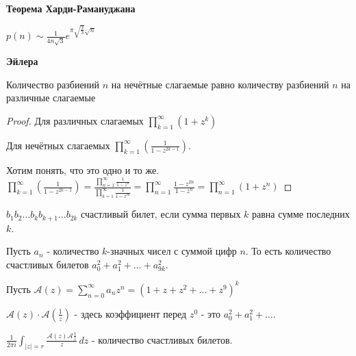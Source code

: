\begin{remark}
    \textbf{Теорема Харди-Рамануджана}

    $p(n) \sim \frac{1}{4n\sqrt{3}} e^{\pi \sqrt{\frac{2}{3}}\sqrt{n}}$
\end{remark}

\begin{theorem}
    \textbf{Эйлера}

    Количество разбиений $n$ на нечётные слагаемые равно количеству разбиений
    $n$ на различные слагаемые
\end{theorem}

\begin{proof}
    Для различных слагаемых $\prod_{k = 1}^{\infty} (1+z^k)$

    Для нечётных слагаемых $\prod_{k = 1}^{\infty} (\frac{1}{1 - z^{2k -1}})$.

    Хотим понять, что это одно и то же.$\prod_{k = 1}^{\infty} (\frac{1}{1 - z^{2k -1}}) =
    \frac{\prod_{n = 1}^{\infty} \frac{1}{1-z^n}}{\prod_{k = 1}^{\infty} \frac{1}{1-z^{2k}}} =
    \prod_{n = 1}^{\infty} \frac{1 - z^{2n}}{1 - z^n} = \prod_{n = 1}^{\infty} (1 + z^n)$
\end{proof}

\begin{example}
    $b_1b_2 \ldots b_k b_{k + 1} \ldots b_{2k}$ счастливый билет, если
    сумма первых $k$ равна сумме последних $k$.

    Пусть $a_n$ - количество $k$-значных чисел с суммой цифр $n$. То есть
    количество счастливых билетов $a_0^2 + a_1^2 + \ldots + a_{9k}^2$.

    Пусть $\mathcal{A}(z) = \sum_{n = 0}^{\infty} a_nz^n = (1 + z + z^2 + \ldots + z^9)^k$

    $\mathcal{A}(z) \cdot \mathcal{A}(\frac{1}{z})$ - здесь коэффициент перед $z^0$ - это $a_0^2 + a_1^2 + \ldots$.

    $\frac{1}{2\pi i} \int_{|z| = r} \frac{\mathcal{A}(z) \mathcal{A}\frac{1}{z}}{z} \, dz$ - количество счастливых билетов.
\end{example}

